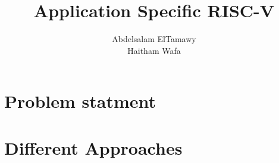 \documentclass{IEEEtran}
\title{Application Specific RISC-V}
\author{Abdelsalam ElTamawy\\Haitham Wafa}
\begin{document}
\maketitle

\section{Problem statment}

\section{Different Approaches}
\end{document}

